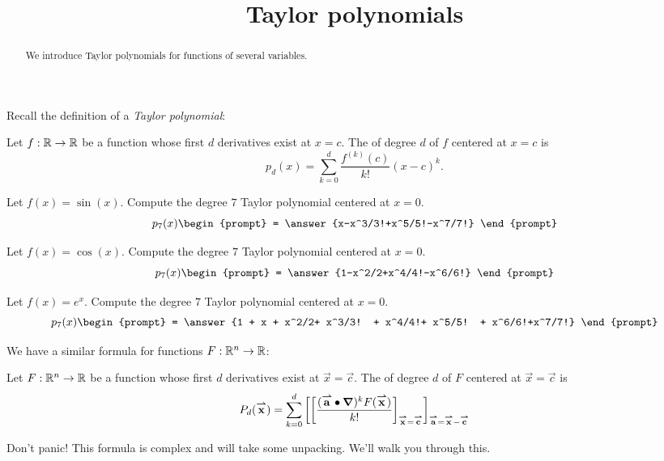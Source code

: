 \documentclass{ximera}
\title[Dig-In:]{Taylor polynomials}
\begin{document}
\begin{abstract}
  We introduce Taylor polynomials for functions of several variables.
\end{abstract}
\maketitle


Recall the definition of a \textit{Taylor polynomial}:

\begin{definition}
  Let $f:\mathbb R\to\mathbb R$ be a function whose first $d$ derivatives exist at $x=c$.
  The  of degree $d$ of $f$ centered at $x=c$ is
  \[
  p_d(x) = \sum_{k=0}^d\frac{f^{(k)}(c)}{k!}(x-c)^k.
  \]
\end{definition}

\begin{question}
  Let $f(x) = \sin(x)$. Compute the degree $7$ Taylor polynomial
  centered at $x=0$.
  \[
  p_7(x)\begin{prompt}
    = \answer{x-x^3/3!+x^5/5!-x^7/7!}
  \end{prompt}
  \]
  \begin{question}
  Let $f(x) = \cos(x)$. Compute the degree $7$ Taylor polynomial
  centered at $x=0$.
  \[
  p_7(x)\begin{prompt}
    = \answer{1-x^2/2+x^4/4!-x^6/6!}
  \end{prompt}
  \]
  \begin{question}
    Let $f(x) = e^x$. Compute the degree $7$ Taylor polynomial
  centered at $x=0$.
    \[
    p_7(x)\begin{prompt}
      = \answer{1 + x + x^2/2+ x^3/3! + x^4/4!+ x^5/5! + x^6/6!+x^7/7!}
    \end{prompt}
    \]
  \end{question}
\end{question}
\end{question}

We have a similar formula for functions $F:\mathbb R^n\to \mathbb R$:
\begin{definition}
  Let $F:\mathbb R^n\to\mathbb R$ be a function whose first $d$ derivatives exist at
  $\vec{x}=\vec{c}$.  The  of degree $d$ of $F$
  centered at $\vec{x}=\vec{c}$ is
  \[
  P_d({\overset{\boldsymbol{\rightharpoonup}}{\mathbf{x}}}) = \sum_{k=0}^d \bigg[ \bigg[ \frac{({\overset{\boldsymbol{\rightharpoonup}}{\mathbf{a}}}\bullet \boldsymbol\nabla)^k F({\overset{\boldsymbol{\rightharpoonup}}{\mathbf{x}}})}{k!} \bigg]_{{\overset{\boldsymbol{\rightharpoonup}}{\mathbf{x}}}={\overset{\boldsymbol{\rightharpoonup}}{\mathbf{c}}}} \bigg]_{{\overset{\boldsymbol{\rightharpoonup}}{\mathbf{a}}}={\overset{\boldsymbol{\rightharpoonup}}{\mathbf{x}}}-{\overset{\boldsymbol{\rightharpoonup}}{\mathbf{c}}}}
  \]
\end{definition}
Don't panic! This formula is complex and will take some
unpacking. We'll walk you through this.
\end{document}
